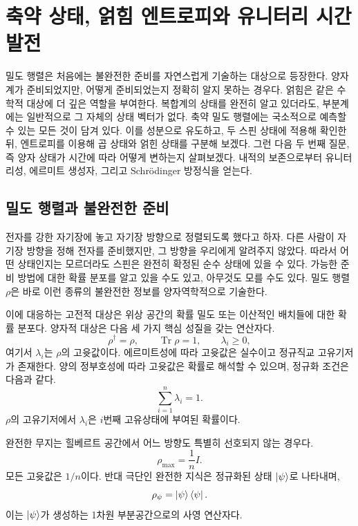 \chapter{축약 상태, 얽힘 엔트로피와 유니터리 시간 발전}

밀도 행렬은 처음에는 불완전한 준비를 자연스럽게 기술하는 대상으로 등장한다. 양자계가 준비되었지만, 어떻게 준비되었는지 정확히 알지 못하는 경우다. 얽힘은 같은 수학적 대상에 더 깊은 역할을 부여한다. 복합계의 상태를 완전히 알고 있더라도, 부분계에는 일반적으로 그 자체의 상태 벡터가 없다. 축약 밀도 행렬에는 국소적으로 예측할 수 있는 모든 것이 담겨 있다. 이를 성분으로 유도하고, 두 스핀 상태에 적용해 확인한 뒤, 엔트로피를 이용해 곱 상태와 얽힌 상태를 구분해 보겠다. 그런 다음 두 번째 질문, 즉 양자 상태가 시간에 따라 어떻게 변하는지 살펴보겠다. 내적의 보존으로부터 유니터리성, 에르미트 생성자, 그리고 Schr\"odinger 방정식을 얻는다.

\section{밀도 행렬과 불완전한 준비}

전자를 강한 자기장에 놓고 자기장 방향으로 정렬되도록 했다고 하자. 다른 사람이 자기장 방향을 정해 전자를 준비했지만, 그 방향을 우리에게 알려주지 않았다. 따라서 어떤 상태인지는 모르더라도 스핀은 완전히 확정된 순수 상태에 있을 수 있다. 가능한 준비 방법에 대한 확률 분포를 알고 있을 수도 있고, 아무것도 모를 수도 있다. 밀도 행렬 \(\rho\)은 바로 이런 종류의 불완전한 정보를 양자역학적으로 기술한다.

이에 대응하는 고전적 대상은 위상 공간의 확률 밀도 또는 이산적인 배치들에 대한 확률 분포다. 양자적 대상은 다음 세 가지 핵심 성질을 갖는 연산자다.
\begin{equation}
\rho^\dagger=\rho,
\qquad
\operatorname{Tr}\rho=1,
\qquad
\lambda_i\geq 0,
\end{equation}
여기서 \(\lambda_i\)는 \(\rho\)의 고윳값이다. 에르미트성에 따라 고윳값은 실수이고 정규직교 고유기저가 존재한다. 양의 정부호성에 따라 고윳값은 확률로 해석할 수 있으며, 정규화 조건은 다음과 같다.
\begin{equation}
\sum_{i=1}^{n}\lambda_i=1.
\end{equation}
\(\rho\)의 고유기저에서 \(\lambda_i\)은 \(i\)번째 고유상태에 부여된 확률이다.

완전한 무지는 힐베르트 공간에서 어느 방향도 특별히 선호되지 않는 경우다.
\begin{equation}
\rho_{\mathrm{max}}=\frac{1}{n}I.
\end{equation}
모든 고윳값은 \(1/n\)이다. 반대 극단인 완전한 지식은 정규화된 상태 \(\left\lvert\psi\right\rangle\)로 나타내며,
\begin{equation}
\rho_\psi=\left\lvert\psi\right\rangle\left\langle\psi\right\rvert.
\end{equation}
이는 \(\left\lvert\psi\right\rangle\)가 생성하는 1차원 부분공간으로의 사영 연산자다.

